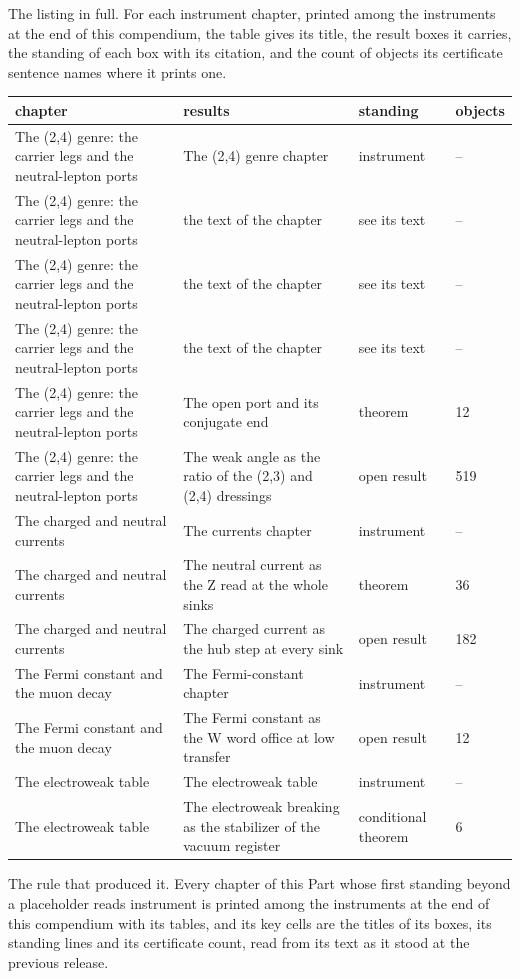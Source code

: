 \begin{chproof}[instrument]
The listing in full. For each instrument chapter, printed among the instruments at the end of this compendium, the table gives its title, the result boxes it carries, the standing of each box with its citation, and the count of objects its certificate sentence names where it prints one.
{\small
\begin{longtable}{p{38mm}p{63mm}p{30mm}p{14mm}}
\hline
chapter & results & standing & objects \\
\hline
\endhead
The (2,4) genre: the carrier legs and the neutral-lepton ports & The (2,4) genre chapter & instrument & -- \\
The (2,4) genre: the carrier legs and the neutral-lepton ports & the text of the chapter & see its text & -- \\
The (2,4) genre: the carrier legs and the neutral-lepton ports & the text of the chapter & see its text & -- \\
The (2,4) genre: the carrier legs and the neutral-lepton ports & the text of the chapter & see its text & -- \\
The (2,4) genre: the carrier legs and the neutral-lepton ports & The open port and its conjugate end & theorem & 12 \\
The (2,4) genre: the carrier legs and the neutral-lepton ports & The weak angle as the ratio of the (2,3) and (2,4) dressings & open result & 519 \\
The charged and neutral currents & The currents chapter & instrument & -- \\
The charged and neutral currents & The neutral current as the Z read at the whole sinks & theorem & 36 \\
The charged and neutral currents & The charged current as the hub step at every sink & open result & 182 \\
The Fermi constant and the muon decay & The Fermi-constant chapter & instrument & -- \\
The Fermi constant and the muon decay & The Fermi constant as the W word office at low transfer & open result & 12 \\
The electroweak table & The electroweak table & instrument & -- \\
The electroweak table & The electroweak breaking as the stabilizer of the vacuum register & conditional theorem & 6 \\
\hline
\end{longtable}
}
The rule that produced it. Every chapter of this Part whose first standing beyond a placeholder reads instrument is printed among the instruments at the end of this compendium with its tables, and its key cells are the titles of its boxes, its standing lines and its certificate count, read from its text as it stood at the previous release.

\end{chproof}
